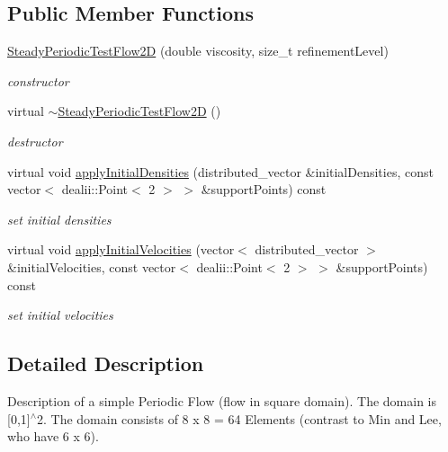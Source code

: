 \subsection*{Public Member Functions}
\begin{DoxyCompactItemize}
\item 
\hyperlink{classnatrium_1_1SteadyPeriodicTestFlow2D_a7db4598e86b34158612497ea2ff0ca74}{Steady\-Periodic\-Test\-Flow2\-D} (double viscosity, size\-\_\-t refinement\-Level)
\begin{DoxyCompactList}\small\item\em constructor \end{DoxyCompactList}\item 
\hypertarget{classnatrium_1_1SteadyPeriodicTestFlow2D_a7344b71a404f2c4bbc73c1c738fdfa22}{virtual \hyperlink{classnatrium_1_1SteadyPeriodicTestFlow2D_a7344b71a404f2c4bbc73c1c738fdfa22}{$\sim$\-Steady\-Periodic\-Test\-Flow2\-D} ()}\label{classnatrium_1_1SteadyPeriodicTestFlow2D_a7344b71a404f2c4bbc73c1c738fdfa22}

\begin{DoxyCompactList}\small\item\em destructor \end{DoxyCompactList}\item 
virtual void \hyperlink{classnatrium_1_1SteadyPeriodicTestFlow2D_a29474cd6d454c3f600693ae2c362cba2}{apply\-Initial\-Densities} (distributed\-\_\-vector \&initial\-Densities, const vector$<$ dealii\-::\-Point$<$ 2 $>$ $>$ \&support\-Points) const 
\begin{DoxyCompactList}\small\item\em set initial densities \end{DoxyCompactList}\item 
virtual void \hyperlink{classnatrium_1_1SteadyPeriodicTestFlow2D_ae0b3291a91029f62b41fd96a128f645a}{apply\-Initial\-Velocities} (vector$<$ distributed\-\_\-vector $>$ \&initial\-Velocities, const vector$<$ dealii\-::\-Point$<$ 2 $>$ $>$ \&support\-Points) const 
\begin{DoxyCompactList}\small\item\em set initial velocities \end{DoxyCompactList}\end{DoxyCompactItemize}


\subsection{Detailed Description}
Description of a simple Periodic Flow (flow in square domain). The domain is \mbox{[}0,1\mbox{]}$^\wedge$2. The domain consists of 8 x 8 = 64 Elements (contrast to Min and Lee, who have 6 x 6). 

